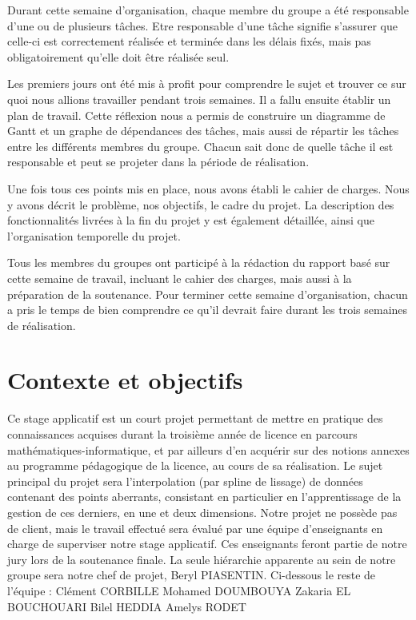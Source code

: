 \documentclass[a4paper,12pt]{article} %
\begin{document}
Durant cette semaine d'organisation, chaque membre du groupe a été responsable d’une ou de plusieurs tâches. Etre responsable d'une tâche signifie s'assurer que celle-ci est correctement réalisée et terminée dans les délais fixés, mais pas obligatoirement qu'elle doit être réalisée seul.

Les premiers jours ont été mis à profit pour comprendre le sujet et trouver ce sur quoi nous allions travailler pendant trois semaines. Il a fallu ensuite établir un plan de travail. Cette réflexion nous a permis de construire un diagramme de Gantt et un graphe de dépendances des tâches, mais aussi de répartir les tâches entre les différents membres du groupe. Chacun sait donc de quelle tâche il est responsable et peut se projeter dans la période de réalisation.

Une fois tous ces points mis en place, nous avons établi le cahier de charges. Nous y avons décrit le problème, nos objectifs, le cadre du projet. La description des fonctionnalités livrées à la fin du projet y est également détaillée, ainsi que l'organisation temporelle du projet. 

Tous les membres du groupes ont participé à la rédaction du rapport basé sur cette semaine de travail, incluant le cahier des charges, mais aussi à la préparation de la soutenance. Pour terminer cette semaine d'organisation, chacun a pris le temps de bien comprendre ce qu'il devrait faire durant les trois semaines de réalisation. 


\newpage
\section{Contexte et objectifs}
Ce stage applicatif est un court projet permettant de mettre en pratique des connaissances acquises durant la troisième année de licence en parcours mathématiques-informatique, et par ailleurs d’en acquérir sur des notions annexes au programme pédagogique de la licence, au cours de sa réalisation. Le sujet principal du projet sera l’interpolation (par spline de lissage) de données contenant des points aberrants, consistant en particulier en l'apprentissage de la gestion de ces derniers, en une et deux dimensions.
Notre projet ne possède pas de client, mais le  travail effectué sera évalué par une équipe d’enseignants en charge de superviser notre stage applicatif. Ces enseignants feront partie de notre jury lors de la soutenance finale. La seule hiérarchie apparente au sein de notre groupe sera notre chef de projet, Beryl PIASENTIN. Ci-dessous le reste de l’équipe :
Clément CORBILLE 
Mohamed DOUMBOUYA
Zakaria EL BOUCHOUARI
Bilel HEDDIA
Amelys RODET
\end{document}
